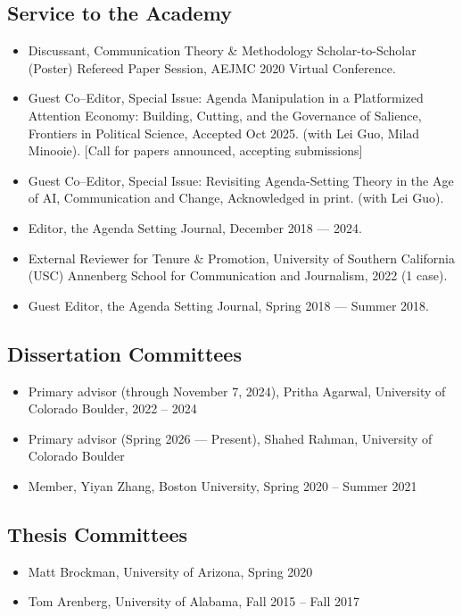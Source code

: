 \documentclass[11pt,letterpaper]{article}
\begin{document}
\subsection*{Service to the Academy}
\begin{itemize}
\item Discussant, Communication Theory \& Methodology Scholar-to-Scholar (Poster) Refereed Paper Session, AEJMC 2020 Virtual Conference.
\item Guest Co--Editor, Special Issue: Agenda Manipulation in a Platformized Attention Economy: Building, Cutting, and the Governance of Salience, Frontiers in Political Science, Accepted Oct 2025. (with Lei Guo, Milad Minooie). [Call for papers announced, accepting submissions]
\item Guest Co--Editor, Special Issue: Revisiting Agenda-Setting Theory in the Age of AI, Communication and Change, Acknowledged in print. (with Lei Guo).
\item Editor, the Agenda Setting Journal, December 2018 --- 2024.
\item External Reviewer for Tenure \& Promotion, University of Southern California (USC) Annenberg School for Communication and Journalism, 2022 (1 case).
\item Guest Editor, the Agenda Setting Journal, Spring 2018 --- Summer 2018.
\end{itemize}
\subsection*{Dissertation Committees}
\begin{itemize}
\item Primary advisor (through November 7, 2024), Pritha Agarwal, University of Colorado Boulder, 2022 -- 2024
\item Primary advisor (Spring 2026 --- Present), Shahed Rahman, University of Colorado Boulder
\item Member, Yiyan Zhang, Boston University, Spring 2020 -- Summer 2021
\end{itemize}
\subsection*{Thesis Committees}
\begin{itemize}
\item Matt Brockman, University of Arizona, Spring 2020
\item Tom Arenberg, University of Alabama, Fall 2015 -- Fall 2017
\end{itemize}
\end{document}
